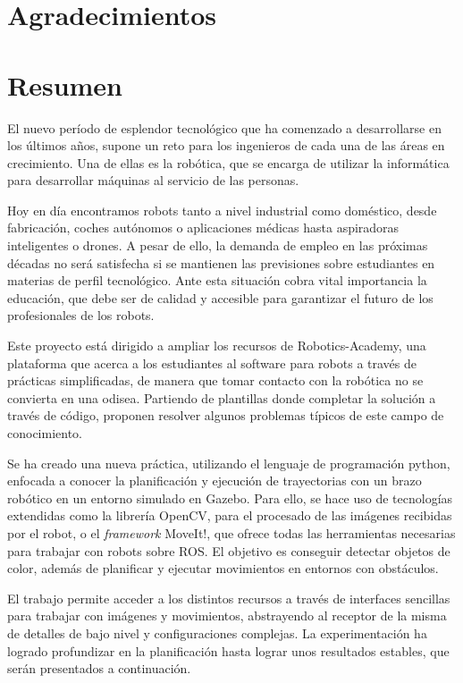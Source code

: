 \documentclass[12pt,spanish,chapterprefix, numbers=noenddot]{book}
\numberwithin{equation}{section}
\numberwithin{figure}{section}
\begin{document}
\chapter*{Agradecimientos}

\chapter*{Resumen}
El nuevo período de esplendor tecnológico que ha comenzado a desarrollarse en los últimos años, supone un reto para los ingenieros de cada una de las áreas en crecimiento. Una de ellas es la robótica, que se encarga de utilizar la informática para desarrollar máquinas al servicio de las personas.  

Hoy en día encontramos robots tanto a nivel industrial como doméstico, desde fabricación, coches autónomos o aplicaciones médicas hasta aspiradoras inteligentes o drones. A pesar de ello, la demanda de empleo en las próximas décadas no será satisfecha si se mantienen las previsiones sobre estudiantes en materias de perfil tecnológico. Ante esta situación cobra vital importancia la educación, que debe ser de calidad y accesible para garantizar el futuro de los profesionales de los robots. 

Este proyecto está dirigido a ampliar los recursos de Robotics-Academy, una plataforma que acerca a los estudiantes al software para robots a través de prácticas simplificadas, de manera que tomar contacto con la robótica no se convierta en una odisea. Partiendo de plantillas donde completar la solución a través de código, proponen resolver algunos problemas típicos de este campo de conocimiento. 

Se ha creado una nueva práctica, utilizando el lenguaje de programación python, enfocada a conocer la planificación y ejecución de trayectorias con un brazo robótico en un entorno simulado en Gazebo. Para ello, se hace uso de tecnologías extendidas como la librería OpenCV, para el procesado de las imágenes recibidas por el robot, o el \textit{framework} MoveIt!, que ofrece todas las herramientas necesarias para trabajar con robots sobre ROS. El objetivo es conseguir detectar objetos de color, además de planificar y ejecutar movimientos en entornos con obstáculos. 

El trabajo permite acceder a los distintos recursos a través de interfaces sencillas para trabajar con imágenes y movimientos, abstrayendo al receptor de la misma de detalles de bajo nivel y configuraciones complejas. La experimentación ha logrado profundizar en la planificación hasta lograr unos resultados estables, que serán presentados a continuación.  
\end{document}
